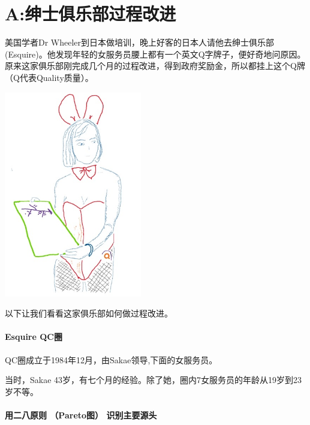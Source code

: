 \chapter{A:绅士俱乐部过程改进} %

美国学者Dr Wheeler到日本做培训，晚上好客的日本人请他去绅士俱乐部(Esquire)。他发现年轻的女服务员腰上都有一个英文Q字牌子，便好奇地问原因。原来这家俱乐部刚完成几个月的过程改进，得到政府奖励金，所以都挂上这个Q牌（Q代表Quality质量）。


\includegraphics[width=6cm]{Esquire2Screenshot2023-10-271322091.jpg}

以下让我们看看这家俱乐部如何做过程改进。

\hypertarget{esquire-qcux5708}{%
\subsubsection{Esquire QC圈}\label{esquire-qcux5708}}

QC圈成立于1984年12月，由Sakae领导,下面的女服务员。

当时，Sakae
43岁，有七个月的经验。除了她，圈内7女服务员的年龄从19岁到23岁不等。

\hypertarget{ux7528ux4e8cux516bux539fux5219-paretoux56fe-ux8bc6ux522bux4e3bux8981ux6e90ux5934}{%
\subsubsection{用二八原则 （Pareto图）
识别主要源头}\label{ux7528ux4e8cux516bux539fux5219-paretoux56fe-ux8bc6ux522bux4e3bux8981ux6e90ux5934}}

